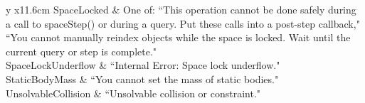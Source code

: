 \documentclass[12pt]{article}
\newcommand{\newfunc}{\\[1.5em]}
\newcommand{\inquote}[1]{``{#1}"}
\begin{document}
\begin{longtable}{y x{11.6cm}}
	    SpaceLocked & One of: \inquote{This operation cannot be done safely during a call to spaceStep() or during a query. Put these calls into a post-step callback,} \inquote{You cannot manually reindex objects while the space is locked. Wait until the current query or step is complete.} \\
	    SpaceLockUnderflow & \inquote{Internal Error: Space lock underflow.} \\
	    StaticBodyMass & \inquote{You cannot set the mass of static bodies.} \\
	    UnsolvableCollision & \inquote{Unsolvable collision or constraint.} \\
	\bottomrule
\end{longtable}



\end{document}
